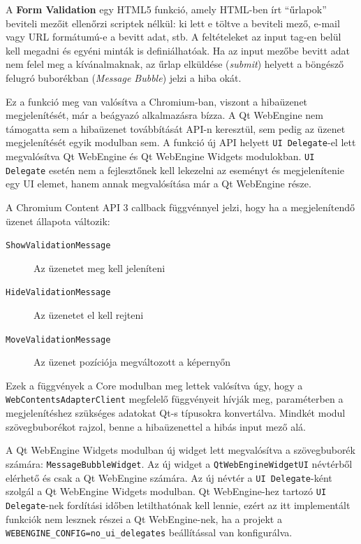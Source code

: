\documentclass[12pt]{report}
\begin{document}
\noindent
A \textbf{Form Validation} egy HTML5 funkció, amely HTML-ben írt ``űrlapok'' beviteli
mezőit ellenőrzi scriptek nélkül: ki lett e töltve a beviteli mező, e-mail vagy URL
formátumú-e a bevitt adat, stb. A feltételeket az input tag-en belül kell megadni és
egyéni minták is definiálhatóak. Ha az input mezőbe bevitt adat nem felel meg a
kívánalmaknak, az űrlap elküldése (\textit{submit}) helyett a böngésző felugró buborékban
(\textit{Message Bubble}) jelzi a hiba okát.

Ez a funkció meg van valósítva a Chromium-ban, viszont a hibaüzenet megjelenítését, már
a beágyazó alkalmazásra bízza. A Qt WebEngine nem támogatta sem a hibaüzenet továbbítását
API-n keresztül, sem pedig az üzenet megjelenítését egyik modulban sem. A funkció új API
helyett \texttt{UI Delegate}-el lett megvalósítva Qt WebEngine és Qt WebEngine Widgets
modulokban. \texttt{UI Delegate} esetén nem a fejlesztőnek kell lekezelni az eseményt és
megjelenítenie egy UI elemet, hanem annak megvalósítása már a Qt WebEngine része.

A Chromium Content API 3 callback függvénnyel jelzi, hogy ha a megjelenítendő üzenet állapota
változik:
\begin{description}
    \item[\texttt{ShowValidationMessage}] Az üzenetet meg kell jeleníteni
    \item[\texttt{HideValidationMessage}] Az üzenetet el kell rejteni
    \item[\texttt{MoveValidationMessage}] Az üzenet pozíciója megváltozott a képernyőn
\end{description}
Ezek a függvények a Core modulban meg lettek valósítva úgy, hogy a \\
\texttt{WebContentsAdapterClient} megfelelő függvényeit hívják meg, paraméterben
a megjelenítéshez szükséges adatokat Qt-s típusokra konvertálva. Mindkét modul
szövegbuborékot rajzol, benne a hibaüzenettel a hibás input mező alá.

A Qt WebEngine Widgets modulban új widget lett megvalósítva a szövegbuborék számára:
\texttt{MessageBubbleWidget}. Az új widget a \texttt{QtWebEngineWidgetUI} névtérből
elérhető és csak a Qt WebEngine számára. Az új névtér a \texttt{UI Delegate}-ként szolgál
a Qt WebEngine Widgets modulban. Qt WebEngine-hez tartozó \texttt{UI Delegate}-nek fordítási
időben letilthatónak kell lennie, ezért az itt implementált funkciók nem lesznek részei
a Qt WebEngine-nek, ha a projekt a \texttt{WEBENGINE\_CONFIG=no\_ui\_delegates} beállítással
van konfigurálva.
\end{document}
